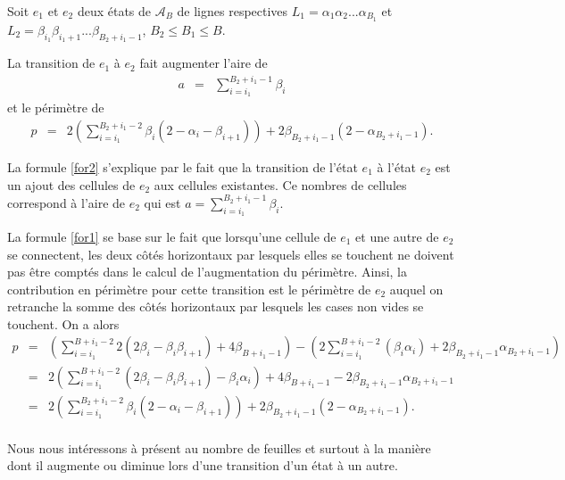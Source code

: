 \begin{Prop}\label{prop5}
Soit $e_{1}$ et $e_{2}$ deux états de $\mathcal{A}_{B}$ de lignes respectives $L_{1}=\alpha_{1}\alpha_{2}...\alpha_{B_{1}}$ et $L_{2}=\beta_{i_{1}}\beta_{i_{1}+1}...\beta_{B_{2}+i_{1}-1}$, $B_{2}\leq B_{1}\leq B$. 

La transition de $e_{1}$ à $e_{2}$ fait augmenter
l'aire  de
\begin{eqnarray}\label{for2}
a & = &\sum_{i=i_{1}}^{B_{2}+i_{1}-1}\beta_{i}
\end{eqnarray}  
et le périmètre de 
\begin{eqnarray}\label{for1}
p & = & 2\left(\sum_{i=i_{1}}^{B_{2}+i_{1}-2}\beta_{i}(2-\alpha_{i}-\beta_{i+1})\right) + 2\beta_{B_{2}+i_{1}-1}(2-\alpha_{B_{2}+i_{1}-1}).
\end{eqnarray}
\end{Prop}
\begin{Pre}
La formule \ref{for2} s'explique par le fait que la transition de l'état $e_{1}$ à  l'état $e_{2}$  est un ajout des  cellules de $e_{2}$ aux cellules existantes. Ce nombres de cellules correspond à l'aire de $e_{2}$ qui est   $a=\displaystyle\sum_{i=i_{1}}^{B_{2}+i_{1}-1}\beta_{i}.$ 
  
La  formule \ref{for1}  se base sur le fait que lorsqu'une cellule de $e_{1}$ et une autre de $e_{2}$ se connectent, les deux côtés horizontaux par lesquels elles se touchent ne doivent pas être comptés dans le calcul de l'augmentation du  périmètre. Ainsi, la contribution en périmètre pour cette transition est le périmètre de $e_{2}$ auquel on retranche la somme des côtés horizontaux par lesquels les cases non vides se touchent. On a alors
\begin{eqnarray*}
p & = & \left(\sum_{i=i_{1}}^{B+i_{1}-2}2(2\beta_{i}-\beta_{i}\beta_{i+1}) + 4\beta_{B+i_{1}-1}\right) -\left(2 \sum_{i=i_{1}}^{B+i_{1}-2} (\beta_{i}\alpha_{i}) +2\beta_{B_{2}+i_{1}-1}\alpha_{B_{2}+i_{1}-1}\right)\\
& = & 2\left(\sum_{i=i_{1}}^{B+i_{1}-2}(2\beta_{i}-\beta_{i}\beta_{i+1})-\beta_{i}\alpha_{i}\right) + 4\beta_{B+i_{1}-1}-2\beta_{B_{2}+i_{1}-1}\alpha_{B_{2}+i_{1}-1}\\
& = & 2\left(\sum_{i=i_{1}}^{B_{2}+i_{1}-2}\beta_{i}(2-\alpha_{i}-\beta_{i+1})\right) + 2\beta_{B_{2}+i_{1}-1}(2-\alpha_{B_{2}+i_{1}-1}).\\
\end{eqnarray*}
\end{Pre}
Nous nous intéressons  à présent au  nombre de feuilles et surtout à la manière dont il augmente ou diminue lors d'une transition  d'un état à un autre.


